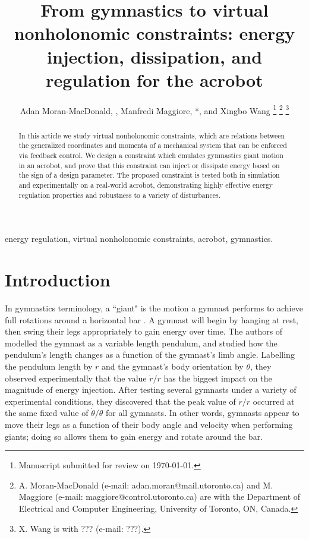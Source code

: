 \documentclass[journal,twoside,web, twocolumn,draftcls]{ieeecolor}
\newcommand*{\Title}{From gymnastics to virtual nonholonomic constraints: energy
injection, dissipation, and regulation for the acrobot}
\begin{document}
\title{\Title}
\author{Adan Moran-MacDonald, , Manfredi Maggiore,
*, and Xingbo Wang
\thanks{Manuscript submitted for review on \today.}
\thanks{A. Moran-MacDonald (e-mail: adan.moran@mail.utoronto.ca) and
M. Maggiore (e-mail: maggiore@control.utoronto.ca) are with the Department of
Electrical and Computer Engineering, University of Toronto, ON, Canada.}
\thanks{X. Wang is with ??? (e-mail: ???).}
} %

\maketitle

\begin{abstract}
    In this article we study virtual nonholonomic constraints, which are
    relations between the generalized coordinates and momenta of a
    mechanical system that can be enforced via feedback control.
    We design a constraint which emulates gymnastics giant motion in an
    acrobot, and prove that this constraint can inject or dissipate
    energy based on the sign of a design parameter.
    The proposed constraint is tested both in simulation and experimentally on a real-world acrobot,
    demonstrating highly effective energy regulation properties and robustness
    to a variety of disturbances.
\end{abstract}

\begin{IEEEkeywords}
    energy regulation, virtual nonholonomic constraints, acrobot, gymnastics.
\end{IEEEkeywords}

\section{Introduction}\label{sec:introduction}

In gymnastics terminology, a ``giant" is the motion a gymnast performs to
achieve full rotations around a horizontal bar \cite{usagym_giant}. 
A gymnast will begin by hanging at rest, then swing their legs
appropriately to gain energy over time.
The authors of \cite{pendulum_length_giant_gymnastics} modelled the gymnast as a
variable length pendulum, and studied how the pendulum's length changes as a
function of the gymnast's limb angle.
Labelling the pendulum length by \(r\) and the gymnast's body orientation
by \(\theta\), they observed experimentally that the value \(\dot{r}/r\) has
the biggest impact on the magnitude of energy injection. 
After testing several gymnasts under a variety of experimental conditions, 
they discovered that the peak value of \(\dot{r}/r\) occurred at the same fixed
value of \(\dot{\theta}/\theta\) for all gymnasts.
In other words, gymnasts appear to move their legs as a function of their body
angle and velocity when performing giants; 
doing so allows them to gain energy and rotate around the bar.
\end{document}
